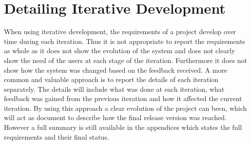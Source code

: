 \documentclass[a4paper,oneside,11pt]{report}
\begin{document}
\section{Detailing Iterative Development}
When using iterative development, the requirements of a project develop over time during each iteration. Thus it is not appropriate to report the requirements as whole as it does not show the evolution of the system and does not clearly show the need of the users at each stage of the iteration. Furthermore it does not show how the system was changed based on the feedback received. A more common and valuable approach is to report the details of each iteration separately. The details will include what was done at each iteration, what feedback was gained from the previous iteration and how it affected the current iteration. By using this approach a clear evolution of the project can been, which will act as document to describe how the final release version was reached. However a full summary is still available in the appendices which states the full requirements and their final status.
 
\end{document}
